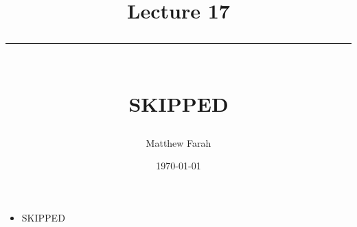 \documentclass{article}
\date{
	\vspace{-.75em}
	{\large \today}
}
\title{
	\vspace*{-1.5em}
	{\Huge Lecture 17} \\
	\vspace{-1em}
	\rule{\textwidth/4}{.01em} \\
	\vspace{-.25em}
	{\Large SKIPPED}
	\vspace{-.75em}
}
\author{
	{\large Matthew Farah}
}
\begin{document}
\maketitle
\pagestyle{fancy}

\fi

\begin{itemize}
	\item SKIPPED
\end{itemize}

\ifdefined\iscombined
	\newpage
\else
	
\end{document}
